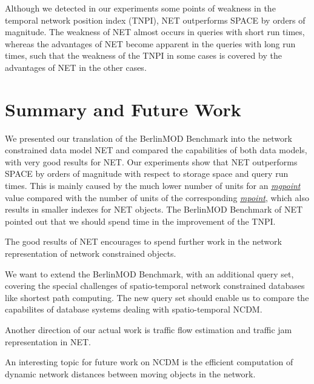 \documentclass[a4paper]{article}
\newcommand{\bmodb} {BerlinMOD Benchmark}
\newcommand{\dt}[1]{\textsl{\underline{#1}}}
\begin{document}
Although we detected in our experiments some points of weakness in the temporal 
network position index (TNPI), NET outperforms SPACE by orders of magnitude. The 
weakness of NET almost occurs in queries with short run times, whereas the advantages
of NET become apparent in the queries with long run times, such that the weakness
of the TNPI in some cases is covered by the advantages of NET in the other cases.
\section{Summary and Future Work}
\label{sec:summary}
We presented our translation of the \bmodb{} into the network constrained data model
NET and compared the capabilities of both data models, with very good results for 
NET. Our experiments show that NET outperforms
SPACE by orders of magnitude with respect to storage space and query run times.
This is mainly caused by the much lower number of units for an \dt{mgpoint} value
compared with the number of units of the corresponding \dt{mpoint}, which also
results in smaller indexes for NET objects. The \bmodb{} of NET pointed out
that we should spend time in the improvement of the TNPI.

The good results of NET encourages to spend further work in the network representation 
of network constrained objects. 

We want to extend the \bmodb{}, with an additional query set, covering the 
special challenges of spatio-temporal network constrained databases like
shortest path computing. The new query set should enable us to compare the
capabilites of database systems dealing with spatio-temporal NCDM.

Another direction of our actual work is traffic flow estimation and traffic jam
representation in NET.

An interesting topic for future work on NCDM is the efficient
computation of dynamic network distances between moving objects in the network.
{}

\appendix
\end{document}

